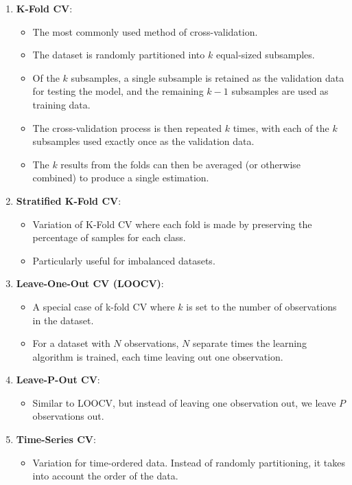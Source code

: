 \documentclass{article}
\begin{document}
\begin{enumerate}
    \item \textbf{K-Fold CV}:
    \begin{itemize}
        \item The most commonly used method of cross-validation.
        \item The dataset is randomly partitioned into \( k \) equal-sized subsamples.
        \item Of the \( k \) subsamples, a single subsample is retained as the validation data for testing the model, and the remaining \( k-1 \) subsamples are used as training data.
        \item The cross-validation process is then repeated \( k \) times, with each of the \( k \) subsamples used exactly once as the validation data.
        \item The \( k \) results from the folds can then be averaged (or otherwise combined) to produce a single estimation.
    \end{itemize}

    \item \textbf{Stratified K-Fold CV}:
    \begin{itemize}
        \item Variation of K-Fold CV where each fold is made by preserving the percentage of samples for each class.
        \item Particularly useful for imbalanced datasets.
    \end{itemize}

    \item \textbf{Leave-One-Out CV (LOOCV)}:
    \begin{itemize}
        \item A special case of k-fold CV where \( k \) is set to the number of observations in the dataset.
        \item For a dataset with \( N \) observations, \( N \) separate times the learning algorithm is trained, each time leaving out one observation.
    \end{itemize}

    \item \textbf{Leave-P-Out CV}:
    \begin{itemize}
        \item Similar to LOOCV, but instead of leaving one observation out, we leave \( P \) observations out.
    \end{itemize}

    \item \textbf{Time-Series CV}:
    \begin{itemize}
        \item Variation for time-ordered data. Instead of randomly partitioning, it takes into account the order of the data.
    \end{itemize}
\end{enumerate}
\end{document}
